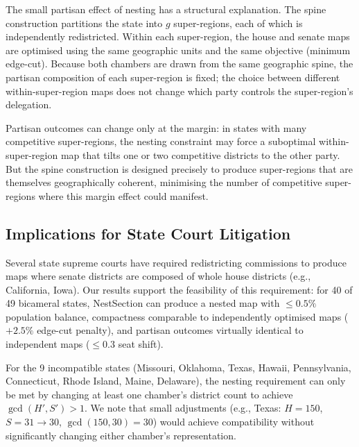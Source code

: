 The small partisan effect of nesting has a structural explanation. The spine
construction partitions the state into $g$ super-regions, each of which is
independently redistricted. Within each super-region, the house and senate maps
are optimised using the same geographic units and the same objective (minimum
edge-cut). Because both chambers are drawn from the same geographic spine,
the partisan composition of each super-region is fixed; the choice between
different within-super-region maps does not change which party controls the
super-region's delegation.

Partisan outcomes can change only at the margin: in states with many competitive
super-regions, the nesting constraint may force a suboptimal within-super-region
map that tilts one or two competitive districts to the other party.
But the spine construction is designed precisely to produce super-regions that
are themselves geographically coherent, minimising the number of competitive
super-regions where this margin effect could manifest.

\subsection{Implications for State Court Litigation}
\label{sec:partisan:litigation}

Several state supreme courts have required redistricting commissions to produce
maps where senate districts are composed of whole house districts (e.g.,
California, Iowa). Our results support the feasibility of this requirement:
for 40 of 49 bicameral states, NestSection can produce a nested map with
$\leq 0.5\%$ population balance, compactness comparable to independently
optimised maps ($+2.5\%$ edge-cut penalty), and partisan outcomes virtually
identical to independent maps ($\leq 0.3$ seat shift).

For the 9 incompatible states (Missouri, Oklahoma, Texas, Hawaii, Pennsylvania,
Connecticut, Rhode Island, Maine, Delaware), the nesting requirement can only
be met by changing at least one chamber's district count to achieve
$\gcd(H', S') > 1$. We note that small adjustments (e.g., Texas: $H=150$,
$S=31 \to 30$, $\gcd(150,30) = 30$) would achieve compatibility without
significantly changing either chamber's representation.
